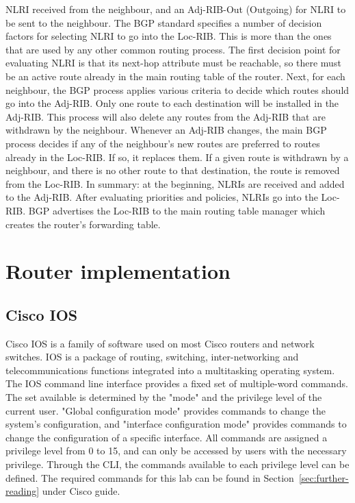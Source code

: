 \documentclass[a4paper]{article}
\begin{document}
NLRI received from the neighbour, and an Adj-RIB-Out (Outgoing) for NLRI to be sent to the neighbour.
The BGP standard specifies a number of decision factors for selecting NLRI to go into the Loc-RIB. This is more than
the ones that are used by any other common routing process. The first decision point for evaluating NLRI is that its
next-hop attribute must be reachable, so there must be an active route already in the main routing table of the router.
Next, for each neighbour, the BGP process applies various criteria to decide which routes should go into the Adj-RIB.
Only one route to each destination will be installed in the Adj-RIB. This process will also delete any routes from the
Adj-RIB that are withdrawn by the neighbour.
Whenever an Adj-RIB changes, the main BGP process decides if any of the neighbour's new routes are preferred to routes
already in the Loc-RIB. If so, it replaces them. If a given route is withdrawn by a neighbour, and there is no other
route to that destination, the route is removed from the Loc-RIB.
In summary: at the beginning, NLRIs are received and added to the Adj-RIB. After evaluating priorities and policies,
NLRIs go into the Loc-RIB. BGP advertises the Loc-RIB to the main routing table manager which creates the router's
forwarding table.

\section{Router implementation}

\subsection{Cisco IOS}

Cisco IOS is a family of software used on most Cisco routers and network switches. IOS is a package of routing,
switching, inter-networking and telecommunications functions integrated into a multitasking operating system. The IOS
command line interface provides a fixed set of multiple-word commands. The set available is determined by the "mode"
and the privilege level of the current user. "Global configuration mode" provides commands to change the system's
configuration, and "interface configuration mode" provides commands to change the configuration of a specific
interface. All commands are assigned a privilege level from 0 to 15, and can only be accessed by users with the
necessary privilege. Through the CLI, the commands available to each privilege level can be defined.
The required commands for this lab can be found in Section~\ref{sec:further-reading} under Cisco guide.
\end{document}
